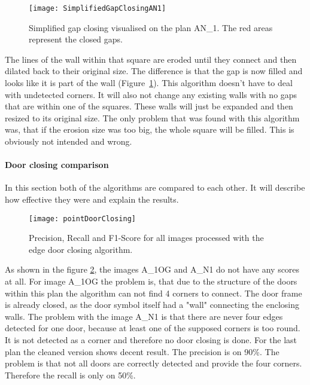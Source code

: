 \begin{figure}[H]
	\centering
	\texttt{[image: SimplifiedGapClosingAN1]}
	\caption{Simplified gap closing visualised on the plan AN\_1. The red areas represent the closed gaps.}
	\label{fig:SimplifiedGapClosingAN1}
\end{figure}

The lines of the wall within that square are eroded until they connect and then dilated back to their original size. The difference is that the gap is now filled and looks like it is part of the wall (Figure~\ref{fig:SimplifiedGapClosingAN1}). This algorithm doesn't have to deal with undetected corners. It will also not change any existing walls with no gaps that are within one of the squares. These walls will just be expanded and then resized to its original size. The only problem that was found with this algorithm was, that if the erosion size was too big, the whole square will be filled. This is obviously not intended and wrong.

\paragraph{Door closing comparison}
In this section both of the algorithms are compared to each other. It will describe how effective they were and explain the results.

\begin{figure}[H]
	\centering
	\texttt{[image: pointDoorClosing]}
	\caption{Precision, Recall and F1-Score for all images processed with the edge door closing algorithm. }
	\label{fig:pointDoorClosing}
\end{figure}

As shown in the figure \ref{fig:pointDoorClosing}, the images A\_1OG and A\_N1 do not have any scores at all. For image A\_1OG the problem is, that due to the structure of the doors within this plan the algorithm can not find 4 corners to connect. The door frame is already closed, as the door symbol itself had a "wall" connecting the enclosing walls. The problem with the image A\_N1 is that there are never four edges detected for one door, because at least one of the supposed corners is too round. It is not detected as a corner and therefore no door closing is done. For the last plan the cleaned version shows decent result. The precision is on 90\%. The problem is that not all doors are correctly detected and provide the four corners. Therefore the recall is only on 50\%.

